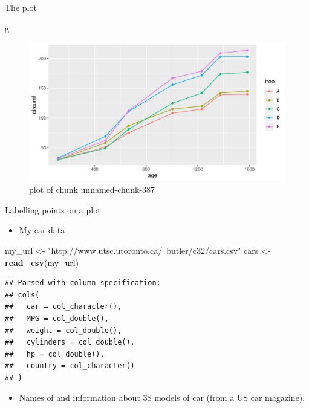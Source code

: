 \documentclass[ignorenonframetext,]{beamer}
\newenvironment{Shaded}{\begin{snugshade}}{\end{snugshade}}
\newcommand{\KeywordTok}[1]{\textcolor[rgb]{0.13,0.29,0.53}{\textbf{#1}}}
\newcommand{\NormalTok}[1]{#1}
\newcommand{\StringTok}[1]{\textcolor[rgb]{0.31,0.60,0.02}{#1}}
\providecommand{\tightlist}{%
  \setlength{\itemsep}{0pt}\setlength{\parskip}{0pt}}
\begin{document}
\begin{frame}[fragile]{The plot}
\protect\hypertarget{the-plot-4}{}

\begin{Shaded}
\begin{Highlighting}[]
\NormalTok{g}
\end{Highlighting}
\end{Shaded}

\begin{figure}
\centering
\includegraphics{figure/unnamed-chunk-387-1.pdf}
\caption{plot of chunk unnamed-chunk-387}
\end{figure}

\end{frame}

\begin{frame}[fragile]{Labelling points on a plot}
\protect\hypertarget{labelling-points-on-a-plot}{}

\begin{itemize}
\tightlist
\item
  My car data
\end{itemize}

\begin{Shaded}
\begin{Highlighting}[]
\NormalTok{my_url <-}\StringTok{ "http://www.utsc.utoronto.ca/~butler/c32/cars.csv"}
\NormalTok{cars <-}\StringTok{ }\KeywordTok{read_csv}\NormalTok{(my_url)}
\end{Highlighting}
\end{Shaded}

\begin{verbatim}
## Parsed with column specification:
## cols(
##   car = col_character(),
##   MPG = col_double(),
##   weight = col_double(),
##   cylinders = col_double(),
##   hp = col_double(),
##   country = col_character()
## )
\end{verbatim}

\begin{itemize}
\tightlist
\item
  Names of and information about 38 models of car (from a US car
  magazine).
\end{itemize}

\end{frame}
\end{document}
